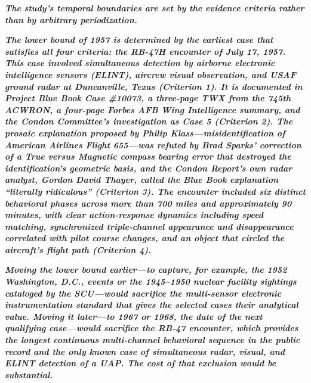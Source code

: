 \documentclass[11pt,letterpaper]{article}
\begin{document}
\textbf{\textit{The study's temporal boundaries are set by the evidence criteria rather than by arbitrary periodization.}}


\textbf{\textit{The lower bound of 1957 is determined by the earliest case that satisfies all four criteria: the RB-47H encounter of July 17, 1957. This case involved simultaneous detection by airborne electronic intelligence sensors (ELINT), aircrew visual observation, and USAF ground radar at Duncanville, Texas (Criterion 1). It is documented in Project Blue Book Case \#10073, a three-page TWX from the 745th ACWRON, a four-page Forbes AFB Wing Intelligence summary, and the Condon Committee's investigation as Case 5 (Criterion 2). The prosaic explanation proposed by Philip Klass---misidentification of American Airlines Flight 655---was refuted by Brad Sparks' correction of a True versus Magnetic compass bearing error that destroyed the identification's geometric basis, and the Condon Report's own radar analyst, Gordon David Thayer, called the Blue Book explanation ``literally ridiculous'' (Criterion 3). The encounter included six distinct behavioral phases across more than 700 miles and approximately 90 minutes, with clear action-response dynamics including speed matching, synchronized triple-channel appearance and disappearance correlated with pilot course changes, and an object that circled the aircraft's flight path (Criterion 4).}}


\textbf{\textit{Moving the lower bound earlier---to capture, for example, the 1952 Washington, D.C., events or the 1945--1950 nuclear facility sightings cataloged by the SCU---would sacrifice the multi-sensor electronic instrumentation standard that gives the selected cases their analytical value. Moving it later---to 1967 or 1968, the date of the next qualifying case---would sacrifice the RB-47 encounter, which provides the longest continuous multi-channel behavioral sequence in the public record and the only known case of simultaneous radar, visual, and ELINT detection of a UAP. The cost of that exclusion would be substantial.}}
\end{document}
